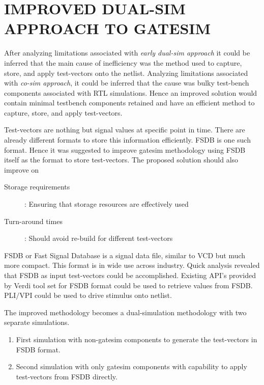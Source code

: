 \chapter{IMPROVED DUAL-SIM APPROACH TO GATESIM}
\label{chap:dualsim.tex}
After analyzing limitations associated with \emph{early dual-sim approach} it could be inferred that the main cause of inefficiency was the method used to capture, store, and apply test-vectors onto the netlist. Analyzing limitations associated with \emph{co-sim approach}, it could be inferred that the cause was bulky test-bench components associated with RTL simulations. Hence an improved solution would contain minimal testbench components retained and have an efficient method to capture, store, and apply test-vectors. 

Test-vectors are nothing but signal values at specific point in time. There are already different formats to store this information efficiently. FSDB  is one such format. Hence it was suggested to improve gatesim methodology using FSDB itself as the format to store test-vectors. The proposed solution should also improve on

\begin{description}
	\item[Storage requirements]: Ensuring that storage resources are effectively used
	\item[Turn-around times]: Should avoid re-build for different test-vectors
\end{description}

FSDB\cite{SS:Verdi} or Fast Signal Database is a signal data file, similar to VCD\cite{ieee:v:2005}  but much more compact. This format is in wide use across industry. Quick analysis revealed that FSDB as input test-vectors could be accomplished. Existing API's  provided by Verdi\cite{SS:Verdi} tool set for FSDB format could be used to retrieve values from FSDB. PLI$/$VPI\cite{ieee:v:2005} could be used to drive stimulus onto netlist.


The improved methodology becomes a dual-simulation methodology with two separate simulations.
\begin{enumerate}
	\item First simulation with non-gatesim components to generate the test-vectors in FSDB format.
	\item Second simulation with only gatesim components with capability to apply test-vectors from FSDB directly.
\end{enumerate}



